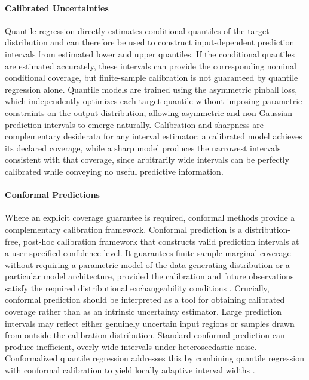 \paragraph{Calibrated Uncertainties} Quantile regression \cite{Koenker1978} directly estimates conditional quantiles of the target distribution and can therefore be used to construct input-dependent prediction intervals from estimated lower and upper quantiles. If the conditional quantiles are estimated accurately, these intervals can provide the corresponding nominal conditional coverage, but finite-sample calibration is not guaranteed by quantile regression alone. Quantile models are trained using the asymmetric pinball loss, which independently optimizes each target quantile without imposing parametric constraints on the output distribution, allowing asymmetric and non-Gaussian prediction intervals to emerge naturally. Calibration and sharpness are complementary desiderata for any interval estimator: a calibrated model achieves its declared coverage, while a sharp model produces the narrowest intervals consistent with that coverage, since arbitrarily wide intervals can be perfectly calibrated while conveying no useful predictive information.

\paragraph{Conformal Predictions} Where an explicit coverage guarantee is required, conformal methods provide a complementary calibration framework. Conformal prediction is a distribution-free, post-hoc calibration framework that constructs valid prediction intervals at a user-specified confidence level. It guarantees finite-sample marg\-inal coverage without requiring a parametric model of the data-generating distribution or a particular model architecture, provided the calibration and future observations satisfy the required distributional exchangeability conditions \cite{Angelopoulos2023}. Crucially, conformal prediction should be interpreted as a tool for obtaining calibrated coverage rather than as an intrinsic uncertainty estimator. Large prediction intervals may reflect either genuinely uncertain input regions or samples drawn from outside the calibration distribution. Standard conformal prediction can produce inefficient, overly wide intervals under heteroscedastic noise. Conformalized quantile regression addresses this by combining quantile regression with conformal calibration to yield locally adaptive interval widths \cite{Romano2019}.

